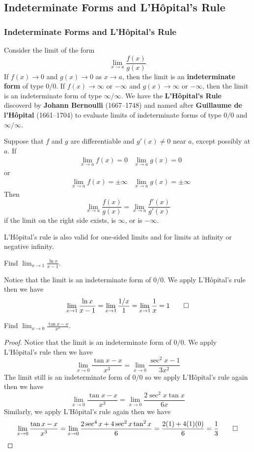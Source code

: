 \subsection{Indeterminate Forms and L'Hôpital's Rule}
\subsubsection{Indeterminate Forms and L'Hôpital's Rule}
Consider the limit of the form \[\lim_{x\to a}\frac{f(x)}{g(x)}\]
If \(f(x)\to 0\) and \(g(x)\to 0\) as \(x\to a\), then the limit is an
\textbf{indeterminate form} of type \(0/0\).
If \(f(x)\to\infty\) or \(-\infty\) and \(g(x)\to\infty\) or \(-\infty\),
then the limit is an indeterminate form of type \(\infty/\infty\).
We have the \textbf{L'Hôpital's Rule} discoverd by
\textbf{Johann Bernoulli} (1667--1748) and named after
\textbf{Guillaume de l'Hôpital} (1661--1704) to evaluate limits of indeterminate
forms of type \(0/0\) and \(\infty/\infty\).
\begin{theorem}
    Suppose that \(f\) and \(g\) are differentiable and \(g'(x)\neq 0\) near \(a\),
    except possibly at \(a\).
    If
    \begin{align*}
        &\lim_{x\to a}f(x)=0&\lim_{x\to a}g(x)=0
    \end{align*}
    or
    \begin{align*}
        &\lim_{x\to a}f(x)=\pm\infty&\lim_{x\to a}g(x)=\pm\infty
    \end{align*}
    Then
    \[\lim_{x\to a}\frac{f(x)}{g(x)}=\lim_{x\to a}\frac{f'(x)}{g'(x)}\]
    if the limit on the right side exists, is \(\infty\), or is \(-\infty\).
\end{theorem}
L'Hôpital's rule is also valid for one-sided limits and for limits at infinity
or negative infinity.
\begin{problem}
    Find \(\displaystyle{\lim_{x\to 1}\frac{\ln x}{x-1}}\).
\end{problem}
\begin{solution}
    Notice that the limit is an indeterminate form of \(0/0\).
    We apply L'Hôpital's rule then we have
    \[\lim_{x\to 1}\dfrac{\ln x}{x-1}=\lim_{x\to 1}\frac{1/x}{1}
    =\lim_{x\to 1}\frac{1}{x}=1\qedhere\]
\end{solution}
\begin{problem}
    Find \(\displaystyle{\lim_{x\to 0}\frac{\tan x-x}{x^3}}\).
\end{problem}
\begin{proof}
    Notice that the limit is an indeterminate form of \(0/0\).
    We apply L'Hôpital's rule then we have
    \[\lim_{x\to 0}\frac{\tan x-x}{x^3}=\lim_{x\to 0}\frac{\sec^2 x-1}{3x^2}\]
    The limit still is an indeterminate form of \(0/0\) so we apply
    L'Hôpital's rule again then we have
    \[\lim_{x\to 0}\frac{\tan x-x}{x^3}
    =\lim_{x\to 0}\frac{2\sec^2 x\tan x}{6x}\]
    Similarly, we apply L'Hôpital's rule again then we have
    \[\lim_{x\to 0}\frac{\tan x-x}{x^3}
    =\lim_{x\to 0}\frac{2\sec^4 x+4\sec^2 x\tan^2 x}{6}
    =\frac{2(1)+4(1)(0)}{6}=\frac{1}{3}\qedhere\]
\end{proof}
